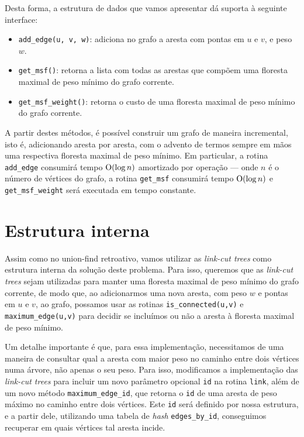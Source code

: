 Desta forma, a estrutura de dados que vamos apresentar dá suporta à seguinte interface:

\begin{itemize}
    \item \texttt{add\_edge(u, v, w)}: adiciona no grafo a aresta com pontas em $u$ e $v$, e peso $w$.
    \item \texttt{get\_msf()}: retorna a lista com todas as arestas que compõem uma floresta maximal de peso mínimo do grafo corrente.
    \item \texttt{get\_msf\_weight()}: retorna o custo de uma floresta maximal de peso mínimo do grafo corrente.
\end{itemize}

A partir destes métodos, é possível construir um grafo de maneira incremental, isto é, adicionando aresta por aresta, com o advento de termos sempre em mãos uma respectiva floresta maximal de peso mínimo. Em particular, a rotina \texttt{add\_edge} consumirá tempo $\mathrm{O} (\log n)$ amortizado por operação --- onde $n$ é o número de vértices do grafo, a rotina \texttt{get\_msf} consumirá tempo $\mathrm{O} (\log n)$ e \texttt{get\_msf\_weight} será executada em tempo constante.

\section{Estrutura interna}
\label{sec:imsf-est-int}

Assim como no union-find retroativo, vamos utilizar as \emph{link-cut trees} como estrutura interna da solução deste problema. Para isso, queremos que as \emph{link-cut trees} sejam utilizadas para manter uma floresta maximal de peso mínimo do grafo corrente, de modo que, ao adicionarmos uma nova aresta, com peso $w$ e pontas em $u$ e $v$, ao grafo, possamos usar as rotinas \texttt{is\_connected(u,v)} e \texttt{maximum\_edge(u,v)} para decidir se incluímos ou não a aresta à floresta maximal de peso mínimo.

Um detalhe importante é que, para essa implementação, necessitamos de uma maneira de consultar qual a aresta com maior peso no caminho entre dois vértices numa árvore, não apenas o seu peso. Para isso, modificamos a implementação das \emph{link-cut trees} para incluir um novo parâmetro opcional \texttt{id} na rotina \texttt{link}, além de um novo  método \texttt{maximum\_edge\_id}, que retorna o \texttt{id} de uma aresta de peso máximo no caminho entre dois vértices. Este \texttt{id} será definido por nossa estrutura, e a partir dele, utilizando uma tabela de \emph{hash} \texttt{edges\_by\_id}, conseguimos recuperar em quais vértices tal aresta incide.

